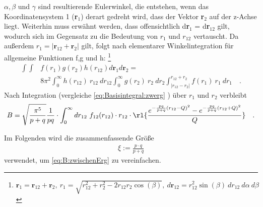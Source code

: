 \begin{enumerate}
	$\alpha,\beta$ und $\gamma$ sind resultierende Eulerwinkel, die entstehen, 
	wenn das Koordinatensystem 1 (\textbf{r}$_1$) derart 
	gedreht wird, dass 
	der Vektor \textbf{r}$_2$ auf der z-Achse liegt. 
	Weiterhin muss erwähnt werden, dass offensichtlich d\textbf{r}$_1$ = 
	d\textbf{r}$_{12}$ gilt, wodurch sich im Gegensatz zu \cite{av:6a} die 
	Bedeutung von $r_1$ und	$r_{12}$ vertauscht. 
	Da außerdem $r_1=|\textbf{r}_{12}+\textbf{r}_2|$ gilt, 
	folgt nach elementarer Winkelintegration für allgemeine Funktionen f,g und 
	h:
	\footnote{$\textbf{r}_1=\textbf{r}_{12}+\textbf{r}_{2},\ 
		r_1=\sqrt{r_{12}^2+r_2^2-2r_{12}r_2\cos(\beta)},\ 
		d\textbf{r}_{12}= r^2_{12} \sin(\beta) \ dr_{12}\ d\alpha\ d\beta$} 
%
	\begin{align}\nonumber
		\int \int & f(r_{1}) g(r_2)h(r_{12}) d\textbf{r}_1d\textbf{r}_2 =\\
		& 8\pi^2\int_{0}^{\infty}h(r_{12})\ r_{12}\ dr_{12}\int_{0}^{\infty} 
		g(r_2)\ r_2\ dr_2 \int_{|r_{12}-r_2|}^{r_{12}+r_2}f(r_{1})\ r_{1}\ 
		dr_{1}\quad.
	\end{align}
	Nach Integration (vergleiche \ref{eq:Basisintegral:zwerg} ) über $r_1$ und 
	$r_2$ verbleibt
	\begin{align}\label{eq:B:zwischenErg}
		B= \sqrt{\frac{\pi^5}{p+q}}\frac{1}{pq}\cdot \int_{0}^{\infty}dr_{12}\ 
		f_{12}(r_{12})\cdot r_{12}\cdot \rl{\frac{e^{-  
		\frac{pq}{p+q}(r_{12}-Q)^2}-e^{-\frac{pq}{p+q}(r_{12}+Q)^2}}{Q}}\quad .
	\end{align}
\end{enumerate} 
%
Im Folgenden wird die zusammenfassende Größe
%
\begin{align}
\xi := \frac{p\cdot q}{p+q}
\end{align}
%
verwendet, um \ref{eq:B:zwischenErg} zu vereinfachen.
%
%
%
